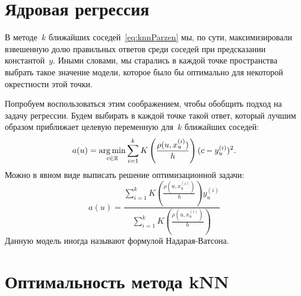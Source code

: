 \documentclass[12pt,fleqn]{article}
\begin{document}
\section{Ядровая регрессия}

В методе~$k$ ближайших соседей~\eqref{eq:knnParzen} мы, по сути, максимизировали взвешенную долю
правильных ответов среди соседей при предсказании константой~$y$.
Иными словами, мы старались в каждой точке пространства выбрать такое значение модели,
которое было бы оптимально для некоторой окрестности этой точки.

Попробуем воспользоваться этим соображением, чтобы обобщить подход на задачу регрессии.
Будем выбирать в каждой точке такой ответ, который лучшим образом приближает целевую переменную
для~$k$ ближайших соседей:
\begin{equation*}
    a(u)
    =
    \mathop{\rm arg\,min}\limits_{c \in \mathbb{R}}
        \sum_{i = 1}^{k}
        K \left(
            \frac{\rho(u, x_u^{(i)})}{h}
        \right)
        (c - y_u^{(i)})^2.
\end{equation*}
Можно в явном виде выписать решение оптимизационной задачи:
\begin{equation}
\label{eq:kernelRegr}
    a(u)
    =
    \frac{
        \sum_{i = 1}^{k}
        K \left(
            \frac{\rho(u, x_u^{(i)})}{h}
        \right)
        y_u^{(i)}
    }{
        \sum_{i = 1}^{k}
        K \left(
            \frac{\rho(u, x_u^{(i)})}{h}
        \right)
    }
\end{equation}
Данную модель иногда называют формулой Надарая-Ватсона.

\section{Оптимальность метода kNN}
\end{document}
